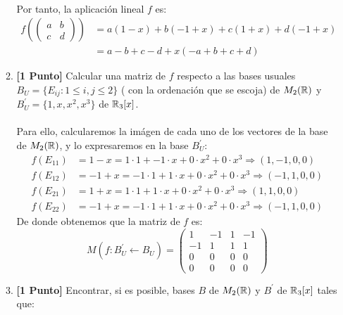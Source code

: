 \documentclass[12pt]{article}
\begin{document}
\begin{enumerate}
\begin{enumerate}
\begin{align*}
		            \end{align*}
		            Por tanto, la aplicación lineal $f$ es:
		            \begin{align*}
			            f\left(\begin{pmatrix}
				                   a & b \\
				                   c & d
			                   \end{pmatrix}\right) & = a(1-x) + b(-1+x) + c(1+x) + d(-1+x) \\ &= a-b+c-d + x(-a+b+c+d)
		            \end{align*}
		      \item \textbf{[1 Punto]} Calcular una matriz de $f$ respecto a las bases usuales $B_U = \{E_{ij} : 1 \leq i, j \leq 2\}$ (
		            con la ordenación que se escoja) de $M_2({\mathbb{R}})$ y $B_U^{'} = \{1,x,x^2,x^3\}$ de ${\mathbb{R}}_3[x]$. \\ \\
		            Para ello, calcularemos la imágen de cada uno de los vectores de la base de $M_2({\mathbb{R}})$, y lo expresaremos en la base
		            $B_U^{'}$:
		            \begin{align*}
			            f(E_{11}) & = 1-x = 1\cdot 1 + -1\cdot x + 0\cdot x^2 + 0\cdot x^3 \Rightarrow  (1,-1,0,0) \\
			            f(E_{12}) & = -1+x = -1\cdot 1 + 1\cdot x + 0\cdot x^2 + 0\cdot x^3 \Rightarrow (-1,1,0,0) \\
			            f(E_{21}) & = 1+x = 1\cdot 1 + 1\cdot x + 0\cdot x^2 + 0\cdot x^3 \Rightarrow (1,1,0,0)    \\
			            f(E_{22}) & = -1+x = -1\cdot 1 + 1\cdot x + 0\cdot x^2 + 0\cdot x^3 \Rightarrow (-1,1,0,0)
		            \end{align*}
		            De donde obtenemos que la matriz de $f$ es:
		            \begin{equation*}
			            M(f:B_U^{'} \leftarrow B_U) = \begin{pmatrix}
				            1  & -1 & 1 & -1 \\
				            -1 & 1  & 1 & 1  \\
				            0  & 0  & 0 & 0  \\
				            0  & 0  & 0 & 0
			            \end{pmatrix}
		            \end{equation*}
		      \item \textbf{[1 Punto]} Encontrar, si es posible, bases $B$ de $M_2({\mathbb{R}})$ y $B^{'}$ de ${\mathbb{R}}_3[x]$ tales que:

\end{enumerate}
\end{enumerate}
\end{document}
